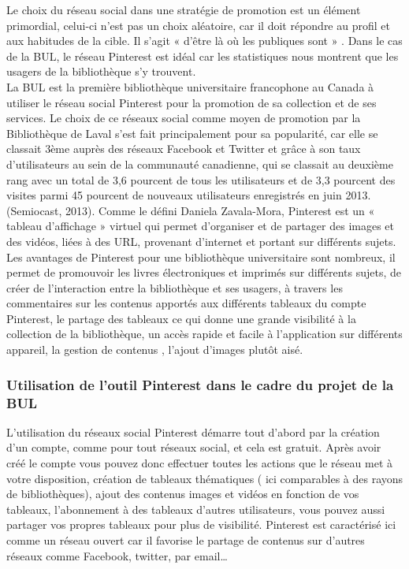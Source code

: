 \documentclass[a4paper,11pt]{article} %
\begin{document}
Le choix du réseau social dans une stratégie de promotion est un élément primordial, 
celui-ci n’est pas un choix aléatoire, car il doit répondre au profil et aux habitudes de la cible. 
Il s’agit « d’être là où les publiques sont » \citep{marois2012reseaux,}. Dans le cas de la BUL, le réseau Pinterest est 
idéal car les statistiques nous montrent que les usagers de la bibliothèque s’y trouvent.
\\La BUL est la première bibliothèque universitaire francophone au Canada à utiliser le 
réseau social Pinterest pour la promotion de sa collection et de ses services. Le choix de ce 
réseaux social comme moyen de promotion par la Bibliothèque de Laval s’est fait 
principalement pour sa popularité, car elle se classait 3ème auprès des réseaux Facebook et 
Twitter et grâce à son taux d’utilisateurs au sein de la communauté canadienne, qui se classait 
au deuxième rang avec un total de 3,6 pourcent de tous les utilisateurs et de 3,3 pourcent des visites parmi 
45 pourcent de nouveaux utilisateurs enregistrés en juin 2013. (Semiocast, 2013). Comme le défini Daniela Zavala-Mora, Pinterest est un « tableau d’affichage » virtuel qui permet d’organiser et de partager des images et des vidéos, liées à des URL\citep{locatorsuniform,}, provenant d’internet et portant sur différents sujets.
\\Les avantages de Pinterest pour une bibliothèque universitaire sont nombreux, il permet de 
promouvoir les livres électroniques et imprimés sur différents sujets, de créer de l’interaction 
entre la bibliothèque et ses usagers, à travers les commentaires sur les contenus apportés aux 
différents tableaux du compte Pinterest, le partage des tableaux ce qui donne une grande 
visibilité à la collection de la bibliothèque, un accès rapide et facile à l’application sur différents 
appareil, la gestion de contenus , l’ajout d’images plutôt aisé.

\subsubsection{ Utilisation de l’outil Pinterest dans le cadre du projet de la BUL}

L’utilisation du réseaux social Pinterest démarre tout d’abord par la création d’un 
compte, comme pour tout réseaux social, et cela est gratuit. Après avoir créé le compte vous 
pouvez donc effectuer toutes les actions que le réseau met à votre disposition, création de 
tableaux thématiques ( ici comparables à des rayons de bibliothèques), ajout des contenus 
images et vidéos en fonction de vos tableaux, l’abonnement à des tableaux d’autres utilisateurs, 
vous pouvez aussi partager vos propres tableaux pour plus de visibilité. Pinterest est caractérisé 
ici comme un réseau ouvert car il favorise le partage de contenus sur d’autres réseaux comme 
Facebook, twitter, par email…
\end{document}
